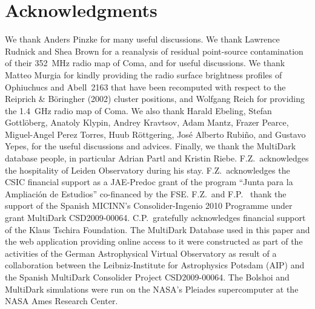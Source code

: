 \documentclass[useAMS,usenatbib]{mn2e}
\begin{document}
\section*{Acknowledgments}
We thank Anders Pinzke for many useful discussions. We thank Lawrence Rudnick
and Shea Brown for a reanalysis of residual point-source contamination of their
352~MHz radio map of Coma, and for useful discussions. We thank Matteo
Murgia for kindly providing the radio surface brightness profiles of Ophiuchucs
and Abell~2163 that have been recomputed with respect to the Reiprich \&
B\"{o}ringher (2002) cluster positions, and Wolfgang Reich for providing the
1.4~GHz radio map of Coma.  We also thank Harald Ebeling, Stefan Gottl{\"o}berg,
Anatoly Klypin, Andrey Kravtsov, Adam Mantz, Frazer Pearce, Miguel-Angel Perez
Torres, Huub R{\"o}ttgering, Jos\'e Alberto Rubi\~no, and Gustavo Yepes, for the
useful discussions and advices.  Finally, we thank the MultiDark database
people, in particular Adrian Partl and Kristin Riebe. 
%
F.Z.{\ }acknowledges the hospitality of Leiden Observatory during his stay.
%
F.Z.{\ }acknowledges the
CSIC financial support as a JAE-Predoc grant of the program ``Junta para la
Ampliaci\'on de Estudios'' co-financed by the FSE. F.Z.{\ }and F.P.{\ } thank
the support of the Spanish MICINN's Consolider-Ingenio 2010 Programme under
grant MultiDark CSD2009-00064. C.P.{\ }gratefully acknowledges financial support
of the Klaus Tschira Foundation. The MultiDark Database used in this paper and
the web application providing online access to it were constructed as part of
the activities of the German Astrophysical Virtual Observatory as result of a
collaboration between the Leibniz-Institute for Astrophysics Potsdam (AIP) and
the Spanish MultiDark Consolider Project CSD2009-00064. The Bolshoi and
MultiDark simulations were run on the NASA's Pleiades supercomputer at the NASA
Ames Research Center.



%

\end{document}
